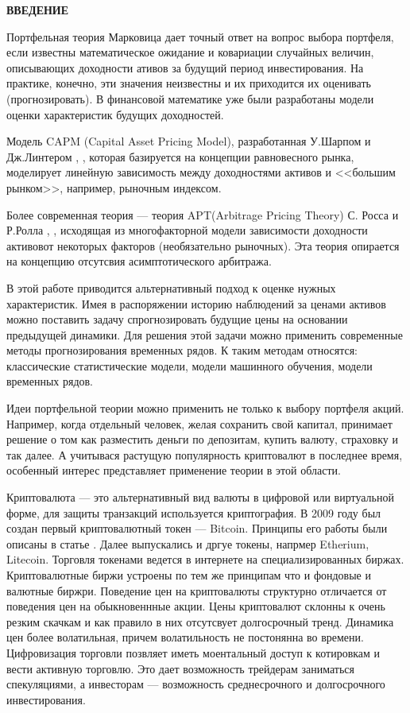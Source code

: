 \newpage
{}
\begin{center}
	\textbf{\large ВВЕДЕНИЕ}
\end{center}

Портфельная теория Марковица дает точный ответ на вопрос выбора портфеля, если известны математическое ожидание
и ковариации случайных величин, описывающих доходности ативов за будущий период инвестирования. На практике, конечно, эти значения неизвестны
и  их приходится их оценивать (прогнозировать). 
В финансовой математике уже были разработаны модели оценки характеристик будущих доходностей.

Модель CAPM (Capital Asset Pricing Model), разработанная У.Шарпом и Дж.Линтером \cite{sharp_capm}, \cite{linter_capm}, которая базируется на
концепции равновесного рынка, моделирует линейную зависимость между доходностями активов и <<большим рынком>>, например, рыночным индексом.

Более современная теория --- теория APT(Arbitrage Pricing Theory) С. Росса и Р.Ролла \cite{ross_apt}, \cite{roll_apt}, исходящая из
многофакторной модели зависимости доходности активовот некоторых факторов (необязательно рыночных).
Эта теория опирается на концепцию отсутсвия асимптотического арбитража.

В этой работе приводится альтернативный подход к оценке нужных характеристик. Имея в распоряжении историю наблюдений за ценами активов можно поставить задачу
спрогнозировать будущие цены на основании предыдущей динамики. Для решения этой задачи можно применить современные методы
прогнозирования временных рядов. К таким методам относятся: классические статистические модели, модели машинного обучения, модели временных рядов.

Идеи портфельной теории можно применить не только к выбору портфеля акций. Например, когда отдельный человек, желая сохранить свой капитал,
принимает решение о том как разместить деньги по депозитам, купить валюту, страховку и так далее. 
А учитывася растущую популярность криптовалют в последнее время, особенный интерес представляет применение теории в этой области.

Криптовалюта --- это альтернативный вид валюты в цифровой или виртуальной форме, для защиты транзакций используется криптография. 
В 2009 году был создан первый криптовалютный токен --- Bitcoin. Принципы его работы были описаны в статье \cite{satoshi}. Далее выпускались
и дргуе токены, напрмер Etherium, Litecoin.
Торговля токенами ведется в интернете на специализированных биржах. Криптовалютные биржи устроены по тем же принципам что и фондовые и валютные биржри.
Поведение цен на криптовалюты структурно отличается от поведения цен на обыкновеннные акции. Цены криптовалют склонны к очень резким скачкам и как
правило в них отсутсвует долгосрочный тренд. Динамика цен более волатильная, причем волатильность не постонянна во времени.
Цифровизация торговли позвляет иметь моентальный доступ к котировкам и вести активную торговлю. 
Это дает возможность трейдерам заниматься спекуляциями, а инвесторам --- возможность среднесрочного и долгосрочного инвестирования.

